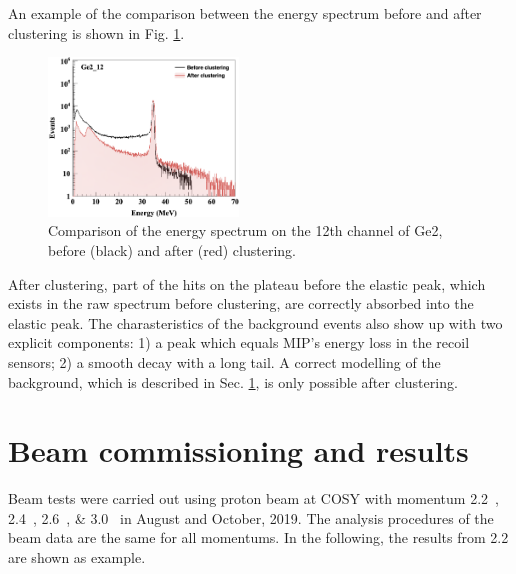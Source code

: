 \documentclass[number,5p]{elsarticle}
\begin{document}
An example of the comparison between the energy spectrum before and after clustering is shown in
Fig. \ref{fig:clustering}.
\begin{figure}[h]
  \centering
  \includegraphics[width=0.45\textwidth]{./clustering.png}
  \caption{Comparison of the energy spectrum on the 12th channel of Ge2, before (black) and after
    (red) clustering.}
  \label{fig:clustering}
\end{figure}
After clustering, part of the hits on the plateau before the elastic peak, which exists in the raw spectrum before clustering, are correctly absorbed into the elastic peak.
The charasteristics of the background events also show up with two explicit
components: 1) a peak which equals MIP's energy loss in the recoil sensors; 2) a smooth decay with a long tail.
A correct modelling of the background, which is described in Sec.
\ref{sec:result}, is only possible after clustering.

\section{Beam commissioning and results}
\label{sec:result}

Beam tests were carried out using proton beam at COSY with momentum
\SIlist[list-units=single]{2.2;2.4;2.6;3.0}{\momentum} in August and October, 2019.
The analysis procedures of the beam data are the same for all momentums.
In the following, the results from \SI{2.2}{\momentum} are shown as example.
\end{document}
